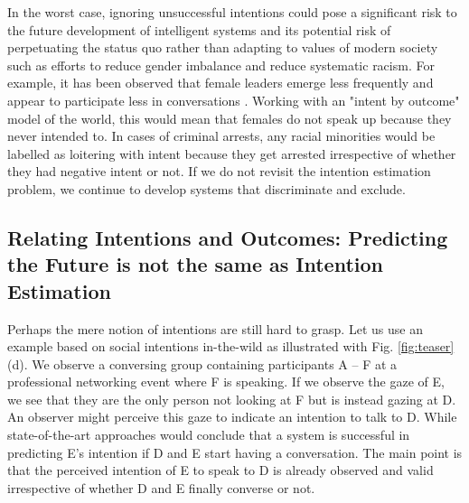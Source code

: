 \documentclass[sigconf]{acmart}
\begin{document}
In the worst case, ignoring unsuccessful intentions could pose a significant risk to the future development of intelligent systems and its potential risk of perpetuating the status quo rather than adapting to values of modern society such as efforts to reduce gender imbalance and reduce systematic racism. For example, it has been observed that female leaders emerge less frequently and appear to participate less in conversations \cite{badura2018gender,GERPOTT2018523,36a5eb2317d14d3aab58408b897ff673}. Working with an "intent by outcome" model of the world, this would mean that females do not speak up because they never intended to. In cases of criminal arrests, any racial minorities would be labelled as loitering with intent because they get arrested irrespective of whether they had negative intent or not. If we do not revisit the intention estimation problem, we continue to develop systems that discriminate and exclude.

\subsection{Relating Intentions and Outcomes: Predicting the Future is not the same as Intention Estimation}

Perhaps the mere notion of intentions are still hard to grasp. Let us use an example based on  social intentions in-the-wild as illustrated with Fig. \ref{fig:teaser}(d). We observe a conversing group containing participants A -- F at a professional networking event where F is speaking.  If we observe the gaze of E, we see that they are the only person not looking at F but is instead gazing at D. An observer might perceive this gaze to indicate an intention to talk to D. While state-of-the-art approaches would conclude that a system is successful in predicting E's intention if D and E start having a conversation. The main point is that the perceived intention of E to speak to D is already observed and valid irrespective of whether D and E finally converse or not. 
\end{document}
